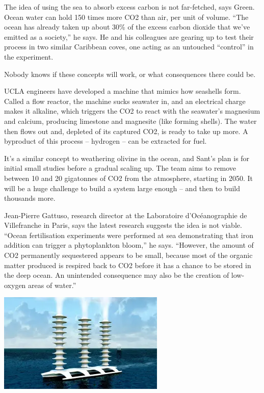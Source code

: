 \documentclass[
]{book}
\begin{document}
The idea of using the sea to absorb excess carbon is not far-fetched, says Green. Ocean water can hold 150 times more CO2 than air, per unit of volume. ``The ocean has already taken up about 30\% of the excess carbon dioxide that we've emitted as a society,'' he says. He and his colleagues are gearing up to test their process in two similar Caribbean coves, one acting as an untouched ``control'' in the experiment.

Nobody knows if these concepts will work, or what consequences there could be.

UCLA engineers have developed a machine that mimics how seashells form. Called a flow reactor, the machine sucks seawater in, and an electrical charge makes it alkaline, which triggers the CO2 to react with the seawater's magnesium and calcium, producing limestone and magnesite (like forming shells). The water then flows out and, depleted of its captured CO2, is ready to take up more. A byproduct of this process -- hydrogen -- can be extracted for fuel.

It's a similar concept to weathering olivine in the ocean, and Sant's plan is for initial small studies before a gradual scaling up. The team aims to remove between 10 and 20 gigatonnes of CO2 from the atmosphere, starting in 2050.
It will be a huge challenge to build a system large enough -- and then to build thousands more.

Jean-Pierre Gattuso, research director at the Laboratoire d'Océanographie de Villefranche in Paris, says the latest research suggests the idea is not viable. ``Ocean fertilisation experiments were performed at sea demonstrating that iron addition can trigger a phytoplankton bloom,'' he says. ``However, the amount of CO2 permanently sequestered appears to be small, because most of the organic matter produced is respired back to CO2 before it has a chance to be stored in the deep ocean. An unintended consequence may also be the creation of low-oxygen areas of water.''

\includegraphics{fig/seawater_spraying_ship.png}
\end{document}
